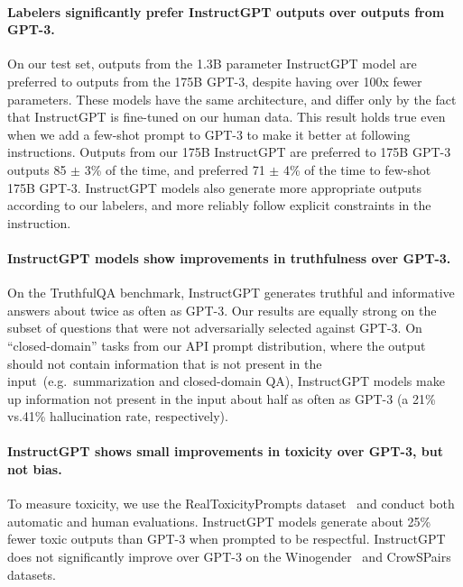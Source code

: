 \documentclass{article}
\begin{document}
\paragraph{Labelers significantly prefer InstructGPT outputs over outputs from GPT-3.} On our test set, outputs from the 1.3B parameter InstructGPT model are preferred to outputs from the 175B GPT-3, despite having over 100x fewer parameters. These models have the same architecture, and differ only by the fact that InstructGPT is fine-tuned on our human data. This result holds true even when we add a few-shot prompt to GPT-3 to make it better at following instructions. 
Outputs from our 175B InstructGPT are preferred to 175B GPT-3 outputs 85 $\pm$ 3\% of the time, and preferred 71 $\pm$ 4\% of the time to few-shot 175B GPT-3. InstructGPT models also generate more appropriate outputs according to our labelers, and more reliably follow explicit constraints in the instruction.

\paragraph{InstructGPT models show improvements in truthfulness over GPT-3.} On the TruthfulQA benchmark, InstructGPT generates truthful and informative answers about twice as often as GPT-3. Our results are equally strong on the subset of questions that were not adversarially selected against GPT-3. On ``closed-domain'' tasks from our API prompt distribution, where the output should not contain information that is not present in the input~(e.g.\ summarization and closed-domain QA), InstructGPT models make up information not present in the input about half as often as GPT-3 (a 21\% vs.\@ 41\% hallucination rate, respectively).

\paragraph{InstructGPT shows small improvements in toxicity over GPT-3, but not bias.} To measure toxicity, we use the RealToxicityPrompts dataset~\citep{gehman2020realtoxicityprompts} and conduct both automatic and human evaluations. InstructGPT models generate about 25\% fewer toxic outputs than GPT-3 when prompted to be respectful. InstructGPT does not significantly improve over GPT-3 on the Winogender~\citep{rudinger2018gender} and CrowSPairs~\citep{nangia2020crows} datasets.    
\end{document}
